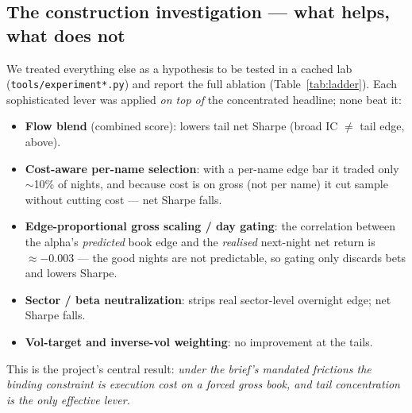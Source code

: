 \documentclass[11pt,a4paper]{article}
\newcommand{\code}[1]{\texttt{#1}}
\newcommand{\edgeCorr}{-0.003}            %
\begin{document}
\subsection{The construction investigation --- what helps, what does not}
We treated everything else as a hypothesis to be tested in a cached lab (\code{tools/experiment*.py}) and
report the full ablation (Table~\ref{tab:ladder}). Each sophisticated lever was applied \emph{on top of} the
concentrated headline; none beat it:
\begin{itemize}
\item \textbf{Flow blend} (combined score): lowers tail net Sharpe (broad IC $\ne$ tail edge, above).
\item \textbf{Cost-aware per-name selection}: with a per-name edge bar it traded only $\sim$10\% of nights, and
because cost is on gross (not per name) it cut sample without cutting cost --- net Sharpe falls.
\item \textbf{Edge-proportional gross scaling / day gating}: the correlation between the alpha's
\emph{predicted} book edge and the \emph{realised} next-night net return is $\approx\edgeCorr$ --- the good
nights are not predictable, so gating only discards bets and lowers Sharpe.
\item \textbf{Sector / beta neutralization}: strips real sector-level overnight edge; net Sharpe falls.
\item \textbf{Vol-target and inverse-vol weighting}: no improvement at the tails.
\end{itemize}
This is the project's central result: \emph{under the brief's mandated frictions the binding constraint is
execution cost on a forced gross book, and tail concentration is the only effective lever.}
\end{document}
